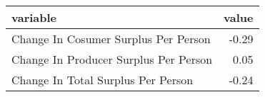\begin{tabular}{lr}
  \hline
variable & value \\ 
  \hline
Change In Cosumer Surplus Per Person & -0.29 \\ 
  Change In Producer Surplus Per Person & 0.05 \\ 
  Change In Total Surplus Per Person & -0.24 \\ 
   \hline
\end{tabular}

